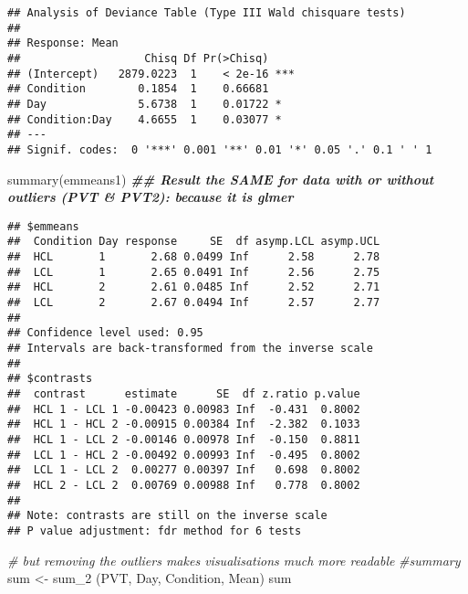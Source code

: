 \documentclass[
]{article}
\newenvironment{Shaded}{\begin{snugshade}}{\end{snugshade}}
\newcommand{\CommentTok}[1]{\textcolor[rgb]{0.56,0.35,0.01}{\textit{#1}}}
\newcommand{\DocumentationTok}[1]{\textcolor[rgb]{0.56,0.35,0.01}{\textbf{\textit{#1}}}}
\newcommand{\FunctionTok}[1]{\textcolor[rgb]{0.00,0.00,0.00}{#1}}
\newcommand{\NormalTok}[1]{#1}
\newcommand{\OtherTok}[1]{\textcolor[rgb]{0.56,0.35,0.01}{#1}}
\newcommand{\StringTok}[1]{\textcolor[rgb]{0.31,0.60,0.02}{#1}}
\begin{document}
\begin{verbatim}
## Analysis of Deviance Table (Type III Wald chisquare tests)
## 
## Response: Mean
##                   Chisq Df Pr(>Chisq)    
## (Intercept)   2879.0223  1    < 2e-16 ***
## Condition        0.1854  1    0.66681    
## Day              5.6738  1    0.01722 *  
## Condition:Day    4.6655  1    0.03077 *  
## ---
## Signif. codes:  0 '***' 0.001 '**' 0.01 '*' 0.05 '.' 0.1 ' ' 1
\end{verbatim}

\begin{Shaded}
\begin{Highlighting}[]
\FunctionTok{summary}\NormalTok{(emmeans1) }\DocumentationTok{\#\# Result the SAME for data with or without outliers (PVT \& PVT2): because it is glmer}
\end{Highlighting}
\end{Shaded}

\begin{verbatim}
## $emmeans
##  Condition Day response     SE  df asymp.LCL asymp.UCL
##  HCL       1       2.68 0.0499 Inf      2.58      2.78
##  LCL       1       2.65 0.0491 Inf      2.56      2.75
##  HCL       2       2.61 0.0485 Inf      2.52      2.71
##  LCL       2       2.67 0.0494 Inf      2.57      2.77
## 
## Confidence level used: 0.95 
## Intervals are back-transformed from the inverse scale 
## 
## $contrasts
##  contrast      estimate      SE  df z.ratio p.value
##  HCL 1 - LCL 1 -0.00423 0.00983 Inf  -0.431  0.8002
##  HCL 1 - HCL 2 -0.00915 0.00384 Inf  -2.382  0.1033
##  HCL 1 - LCL 2 -0.00146 0.00978 Inf  -0.150  0.8811
##  LCL 1 - HCL 2 -0.00492 0.00993 Inf  -0.495  0.8002
##  LCL 1 - LCL 2  0.00277 0.00397 Inf   0.698  0.8002
##  HCL 2 - LCL 2  0.00769 0.00988 Inf   0.778  0.8002
## 
## Note: contrasts are still on the inverse scale 
## P value adjustment: fdr method for 6 tests
\end{verbatim}

\begin{Shaded}
\begin{Highlighting}[]
\CommentTok{\# but removing the outliers makes visualisations much more readable}
\CommentTok{\#summary }
\NormalTok{sum }\OtherTok{\textless{}{-}} \FunctionTok{sum\_2}\NormalTok{ (PVT, }\StringTok{\textquotesingle{}Day\textquotesingle{}}\NormalTok{, }\StringTok{\textquotesingle{}Condition\textquotesingle{}}\NormalTok{, }\StringTok{\textquotesingle{}Mean\textquotesingle{}}\NormalTok{)}
\NormalTok{sum}
\end{Highlighting}
\end{Shaded}
\end{document}
